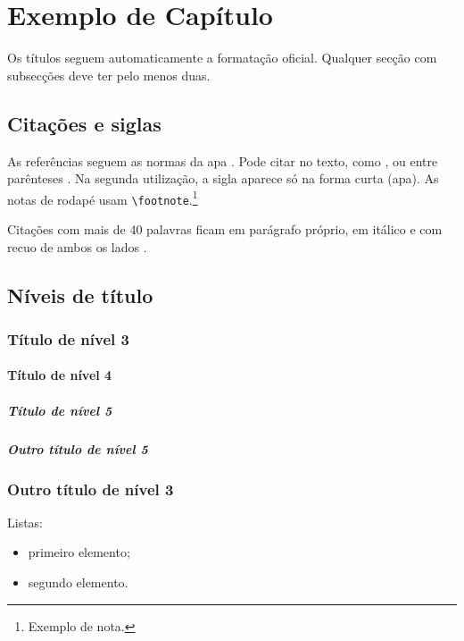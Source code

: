 \chapter{Exemplo de Capítulo}
\label{cap:exemplo}

Os títulos seguem automaticamente a formatação oficial. Qualquer secção com
subsecções deve ter pelo menos duas.

\section{Citações e siglas}

As referências seguem as normas da \gls{apa} \parencite{APA2020}. Pode citar
no texto, como \textcite{Deterding2011}, ou entre parênteses
\parencite{Resnick2009}. Na segunda utilização, a sigla aparece só na forma
curta (\gls{apa}). As notas de rodapé usam \verb|\footnote|.\footnote{Exemplo de nota.}

\begin{citacao}
Citações com mais de 40 palavras ficam em parágrafo próprio, em itálico e com
recuo de ambos os lados \parencite[p.~171]{APA2020}. \lipsum[2][1-3]
\end{citacao}

\section{Níveis de título}

\subsection{Título de nível 3}

\lipsum[3][1-4]

\subsubsection{Título de nível 4}

\lipsum[4][1-4]

\paragraph{Título de nível 5}

\lipsum[5][1-4]

\paragraph{Outro título de nível 5}

\lipsum[6][1-4]

\subsection{Outro título de nível 3}

Listas:
\begin{itemize}
  \item primeiro elemento;
  \item segundo elemento.
\end{itemize}
